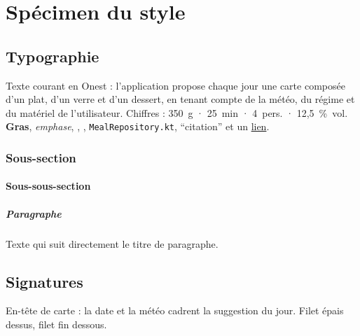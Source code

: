 \documentclass[a4paper,10pt]{report}
\begin{document}
\pageDeGarde
\tableofcontents

\chapter{Spécimen du style}

\section{Typographie}

Texte courant en Onest : l'application propose chaque jour une carte
composée d'un plat, d'un verre et d'un dessert, en tenant compte de la
météo, du régime et du matériel de l'utilisateur. Chiffres :
350~g · 25~min · 4~pers. · 12,5~\%~vol. \textbf{Gras}, \emph{emphase},
, ,
\texttt{MealRepository.kt}, \enquote{citation} et un
\href{https://www.themealdb.com}{lien}.

\subsection{Sous-section}

\subsubsection{Sous-sous-section}

\paragraph{Paragraphe} Texte qui suit directement le titre de paragraphe.

\section{Signatures}


\medskip
{}\quad
{}\quad
{}\quad
{}\quad
{}\quad
{}

\begin{lignes}
\end{lignes}

\begin{carte}
  En-tête de carte : la date et la météo cadrent la suggestion du jour.
  Filet épais dessus, filet fin dessous.
\end{carte}
\end{document}
